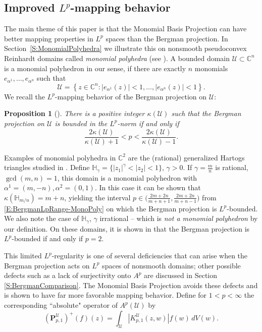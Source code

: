 \documentclass[letterpaper,11pt,reqno]{amsart}
\theoremstyle{plain}
\newtheorem{proposition}[equation]{Proposition}
\theoremstyle{definition}
\theoremstyle{remark}
\theoremstyle{remark}
\numberwithin{equation}{section}
\newcommand{\abs}[1]{\left\vert#1\right\vert}
\newcommand{\cx}{{\mathbb C}}
\newcommand{\C}{{\mathbb C}}
\newcommand{\h}{{\mathbb H}}
\newcommand{\Uu}{\mathscr{U}}
\begin{document}
\subsection{Improved \texorpdfstring{$L^p$}{lp}-mapping behavior}\label{SS:Intro-monomial-polyhedra}
The main theme of this paper is that the Monomial Basis Projection can have better mapping properties in $L^p$ spaces than the Bergman projection.
In Section~\ref{S:MonomialPolyhedra} we illustrate this on nonsmooth pseudoconvex Reinhardt domains called \emph{monomial polyhedra} (see \cite{NagPraDuke09,bcem}).
A bounded domain $\Uu\subset\cx^n$ is a monomial polyhedron in our sense, if there are exactly $n$ monomials $e_{\alpha^1}, \dots, e_{\alpha^n}$ such that
\[
\Uu = \left\{z\in \cx^n:\abs{e_{\alpha^1}(z)}<1, \dots, \abs{e_{\alpha^n}(z)}<1\right\}.
\]
We recall the $L^p$-mapping behavior of the Bergman projection on $\Uu$:
\begin{proposition}[\cite{bcem}]\label{P:BergmanLpRange-MonoPoly}
There is a positive integer $\kappa(\Uu)$ such that the Bergman projection  on $\Uu$ is bounded in the $L^p$-norm if and only if
\begin{equation}\label{E:BergmanLpRange-MonoPoly}
\frac{2\kappa(\Uu)}{\kappa(\Uu)+1}  < p < \frac{2\kappa(\Uu)}{\kappa(\Uu)-1}.
\end{equation}
\end{proposition}
Examples of monomial polyhedra in $\C^2$ are the (rational) generalized Hartogs triangles studied in \cite{EdhMcN16,EdhMcN16b}. 
Define $\h_\gamma=\{|z_1|^\gamma<|z_2|<1 \}$, $\gamma > 0$. 
If $\gamma = \frac{m}{n}$ is rational, $\gcd(m,n)=1$, this domain is a monomial polyhedron with $\alpha^1 = (m,-n), \alpha^2 = (0,1)$. 
In this case it can be shown that $\kappa(\h_{m/n}) = m+n$, yielding the interval $p \in \big(\frac{2m+2n}{m+n+1},\frac{2m+2n}{m+n-1}\big)$ from \eqref{E:BergmanLpRange-MonoPoly} on which the Bergman projection is $L^p$-bounded.
We also note the case of $\h_\gamma$, $\gamma$ irrational -- which is {\em not a monomial polyhedron} by our definition.
On these domains, it is shown in \cite{EdhMcN16b} that the Bergman projection is $L^p$-bounded if and only if $p = 2$.

This limited $L^p$-regularity is one of several deficiencies that can arise when the Bergman projection acts on $L^p$ spaces of nonsmooth domains; other possible defects such as a lack of surjectivity onto $A^p$ are discussed in Section \ref{S:BergmanComparison}.
The Monomial Basis Projection avoids these defects and is shown to have far more favorable mapping behavior.
Define for $1<p<\infty$ the corresponding ``absolute" operator of $A^p(\Uu)$ by
\begin{equation}\label{E:unweightedAMBO}
(\bm{P}^{\Uu}_{p,1})^+(f)(z) = \int_{\Uu}  \abs{K_{p,1}^\Uu(z,w)} f(w) \,dV(w).
\end{equation}
\end{document}
